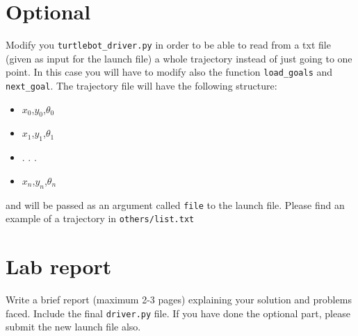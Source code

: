 \documentclass[a4paper,10pt]{article}
\begin{document}
\section{Optional}

Modify you \texttt{turtlebot\_driver.py} in order to be able to read from a txt file (given as input for the launch file) a whole trajectory instead of just going to one point. In this case you will have to modify also the function \texttt{load\_goals} and \texttt{next\_goal}. The trajectory file will have the following structure:
\begin{shaded}
	\begin{itemize}
		\item[] $x_0$,$y_0$,$\theta_0$
		\item[] $x_1$,$y_1$,$\theta_1$
		\item[] . . .
		\item[] $x_n$,$y_n$,$\theta_n$
	\end{itemize}
\end{shaded}
and will be passed as an argument called \texttt{file} to the launch file. Please find an example of a trajectory in \texttt{others/list.txt}

\section{Lab report}

Write a brief report (maximum 2-3 pages) explaining your solution and problems faced. Include the final \texttt{driver.py} file. If you have done the optional part, please submit the new launch file also.
\end{document}
